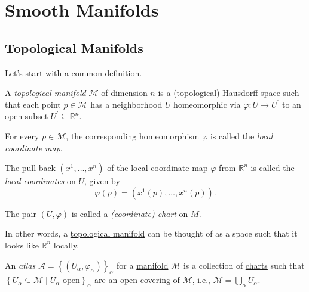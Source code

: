 \chapter{Smooth Manifolds}
\section{Topological Manifolds}
Let's start with a common definition.

\begin{definition}\label{def:topological-manifold}
	A \emph{topological manifold} \(\mathcal{M} \) of dimension \(n\) is a (topological) Hausdorff space such that each point \(p\in \mathcal{M} \) has a neighborhood \(U\) homeomorphic via \(\varphi\colon U \to U^\prime \) to an open subset \(U^\prime \subseteq \mathbb{R} ^n\).
	\begin{definition}\label{def:local-coordinate-map}
		For every \(p\in \mathcal{M} \), the corresponding homeomorphism \(\varphi \) is called the \emph{local coordinate map}.
	\end{definition}
	\begin{definition}\label{def:local-coordinate}
		The pull-back \((x^1, \dots , x^n)\) of the \hyperref[def:local-coordinate-map]{local coordinate map} \(\varphi \) from \(\mathbb{R} ^n\) is called the \emph{local coordinates} on \(U\), given by
		\[
			\varphi (p) = (x^1(p), \dots , x^n(p)).
		\]
	\end{definition}
	\begin{definition}\label{def:coordinate-chart}
		The pair \((U, \varphi )\) is called a \emph{(coordinate) chart} on \(M\).
	\end{definition}
\end{definition}

In other words, a \hyperref[def:topological-manifold]{topological manifold} can be thought of as a space such that it looks like \(\mathbb{R} ^n\) locally.

\begin{center}
\end{center}

\begin{definition}[Atlas]\label{def:atlas}
	An \emph{atlas} \(\mathcal{A} = \left\{ (U_\alpha , \varphi _\alpha) \right\}_\alpha \) for a \hyperref[def:topological-manifold]{manifold} \(\mathcal{M}\) is a collection of \hyperref[def:coordinate-chart]{charts} such that \(\left\{ U_\alpha\subseteq \mathcal{M} \mid U_\alpha \text{ open} \right\} _\alpha \) are an open covering of \(\mathcal{M} \), i.e., \(\mathcal{M} = \bigcup_{\alpha } U_\alpha \).
\end{definition}

